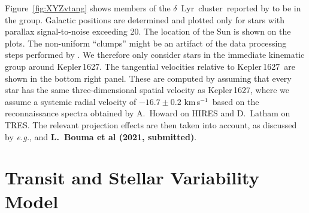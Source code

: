 \documentclass[12pt,modern,twocolumn,tighten]{aastex63}
\newcommand{\cn}{$\delta$~Lyr\ cluster} %
\newcommand{\sn}{Kepler\,1627} %
\newcommand{\kms}{\,km\,s$^{-1}$}
\begin{document}
Figure~\ref{fig:XYZvtang} shows members of the \cn\
reported
by \citet{kounkel_untangling_2019} to be in the group.
Galactic positions are determined and plotted only for stars with parallax
signal-to-noise exceeding 20.
The location of the Sun is shown on the plots.
The non-uniform ``clumps'' might be
an artifact of the data processing steps performed by \citet{kounkel_untangling_2019}.
We therefore only consider stars in the immediate kinematic group
around \sn. 
The tangential velocities relative to \sn\ are shown in the bottom right panel.
These are computed by assuming that every star has the same three-dimensional
spatial velocity as \sn, where we assume a systemic radial velocity of
$-16.7 \pm 0.2$\,\kms\ based on the reconnaissance spectra obtained by
A.~Howard on HIRES and D.~Latham on TRES.
The relevant projection effects are then taken into account,
as discussed by {\it e.g.}, \citet{Meingast2021} and {\bf L.~Bouma et al (2021, submitted)}.



\section{Transit and Stellar Variability Model}
\label{app:gptransit}
\end{document}
